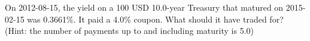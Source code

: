 On 2012-08-15, the yield on a 100 USD 10.0-year Treasury that matured on 2015-02-15 was 0.3661\%. It paid a 4.0\% coupon. What should it have traded for? (Hint: the number of payments up to and including maturity is 5.0)
